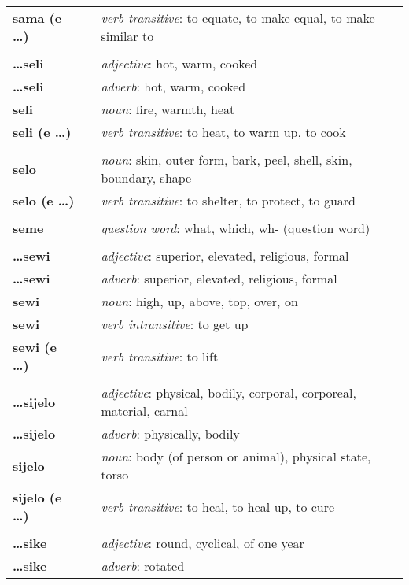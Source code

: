 \begin{supertabular}{p{2,5cm}|ll}
\textbf{sama (e \dots)} && \textit{verb transitive}: to equate, to make equal, to make similar to \\ 
 && \\ %
\textbf{\dots seli} && \textit{adjective}: hot, warm, cooked \\ 
\textbf{\dots seli} && \textit{adverb}: hot, warm, cooked \\ 
\textbf{seli} && \textit{noun}: fire, warmth, heat \\ 
\textbf{seli (e \dots)} && \textit{verb transitive}: to heat, to warm up, to cook \\ 
 && \\ %
\textbf{selo} && \textit{noun}: skin, outer form, bark, peel, shell, skin, boundary, shape \\ 
\textbf{selo (e \dots)} && \textit{verb transitive}: to shelter, to protect, to guard \\ 
 && \\ %
\textbf{seme} && \textit{question word}: what, which, wh- (question word) \\ 
 && \\ %
\textbf{\dots sewi} && \textit{adjective}: superior, elevated, religious, formal \\ 
\textbf{\dots sewi} && \textit{adverb}: superior, elevated, religious, formal \\ 
\textbf{sewi} && \textit{noun}: high, up, above, top, over, on \\ 
\textbf{sewi} && \textit{verb intransitive}: to get up \\ 
\textbf{sewi (e \dots)} && \textit{verb transitive}: to lift \\ 
 && \\ %
\textbf{\dots sijelo} && \textit{adjective}: physical, bodily, corporal, corporeal, material, carnal \\ 
\textbf{\dots sijelo} && \textit{adverb}: physically, bodily \\ 
\textbf{sijelo} && \textit{noun}: body (of person or animal), physical state, torso \\ 
\textbf{sijelo (e \dots)} && \textit{verb transitive}: to heal, to heal up, to cure \\ 
 && \\ %
\textbf{\dots sike} && \textit{adjective}: round, cyclical, of one year \\ 
\textbf{\dots sike} && \textit{adverb}: rotated \\ 

\end{supertabular}

